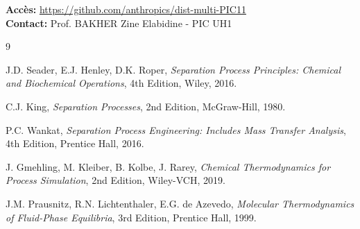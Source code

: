 \documentclass[11pt,a4paper]{article}
\begin{document}
\noindent\textbf{Accès:} \url{https://github.com/anthropics/dist-multi-PIC11}\\
\textbf{Contact:} Prof. BAKHER Zine Elabidine - PIC UH1


\begin{thebibliography}{9}

J.D. Seader, E.J. Henley, D.K. Roper,
\textit{Separation Process Principles: Chemical and Biochemical Operations},
4th Edition, Wiley, 2016.

C.J. King,
\textit{Separation Processes},
2nd Edition, McGraw-Hill, 1980.

P.C. Wankat,
\textit{Separation Process Engineering: Includes Mass Transfer Analysis},
4th Edition, Prentice Hall, 2016.

J. Gmehling, M. Kleiber, B. Kolbe, J. Rarey,
\textit{Chemical Thermodynamics for Process Simulation},
2nd Edition, Wiley-VCH, 2019.

J.M. Prausnitz, R.N. Lichtenthaler, E.G. de Azevedo,
\textit{Molecular Thermodynamics of Fluid-Phase Equilibria},
3rd Edition, Prentice Hall, 1999.

\end{thebibliography}
\end{document}
